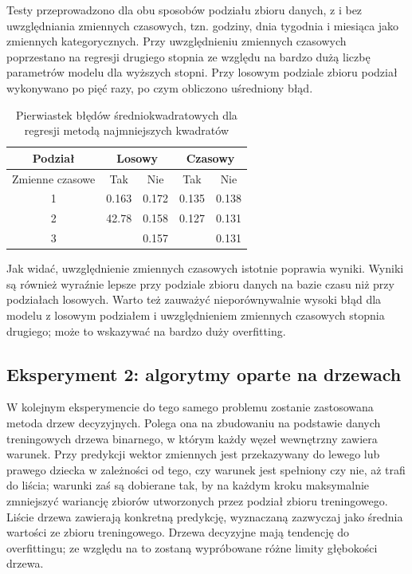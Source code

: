 \documentclass[18pt, letterpaper]{article}
\begin{document}
Testy przeprowadzono dla obu sposobów podziału zbioru danych, z i bez uwzględniania zmiennych czasowych, tzn. godziny, dnia tygodnia i miesiąca jako zmiennych kategorycznych. Przy uwzględnieniu zmiennych czasowych poprzestano na regresji drugiego stopnia ze względu na bardzo dużą liczbę parametrów modelu dla wyższych stopni. Przy losowym podziale zbioru podział wykonywano po pięć razy, po czym obliczono uśredniony błąd.

\begin{table}[H]
\centering
\begin{tabular}{|c|cc|cc|}
\hline
Podział         & \multicolumn{2}{c|}{Losowy}        & \multicolumn{2}{c|}{Czasowy}       \\ \hline
Zmienne czasowe & \multicolumn{1}{c|}{Tak}   & Nie   & \multicolumn{1}{c|}{Tak}   & Nie   \\ \hline
1               & \multicolumn{1}{c|}{0.163} & 0.172 & \multicolumn{1}{c|}{0.135} & 0.138 \\ \hline
2               & \multicolumn{1}{c|}{42.78} & 0.158 & \multicolumn{1}{c|}{0.127} & 0.131 \\ \hline
3               & \multicolumn{1}{c|}{}      & 0.157 & \multicolumn{1}{c|}{}      & 0.131 \\ \hline
\end{tabular}
\caption{Pierwiastek błędów średniokwadratowych dla regresji metodą najmniejszych kwadratów}
\label{table:linear_results}
\end{table}

 Jak widać, uwzględnienie zmiennych czasowych istotnie poprawia wyniki. Wyniki są również wyraźnie lepsze przy podziale zbioru danych na bazie czasu niż przy podziałach losowych. Warto też zauważyć nieporównywalnie wysoki błąd dla modelu z losowym podziałem i uwzględnieniem zmiennych czasowych stopnia drugiego; może to wskazywać na bardzo duży overfitting.

\subsection{Eksperyment 2: algorytmy oparte na drzewach}

W kolejnym eksperymencie do tego samego problemu zostanie zastosowana metoda drzew decyzyjnych. Polega ona na zbudowaniu na podstawie danych treningowych drzewa binarnego, w którym każdy węzeł wewnętrzny zawiera warunek. Przy predykcji wektor zmiennych jest przekazywany do lewego lub prawego dziecka w zależności od tego, czy warunek jest spełniony czy nie, aż trafi do liścia; warunki zaś są dobierane tak, by na każdym kroku maksymalnie zmniejszyć wariancję zbiorów utworzonych przez podział zbioru treningowego. Liście drzewa zawierają konkretną predykcję, wyznaczaną zazwyczaj jako średnia wartości ze zbioru treningowego. Drzewa decyzyjne mają tendencję do overfittingu; ze względu na to zostaną wypróbowane różne limity głębokości drzewa.
\end{document}
